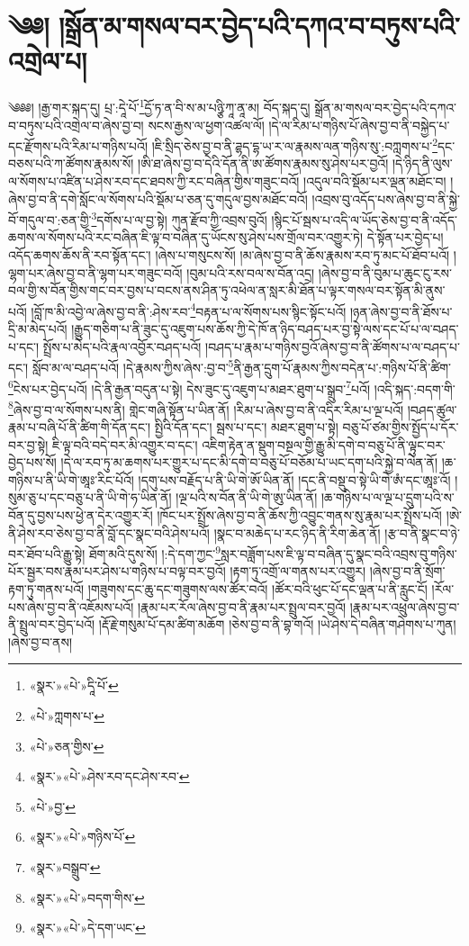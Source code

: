 \chapter{༄༅། །སྒྲོན་མ་གསལ་བར་བྱེད་པའི་དཀའ་བ་བཏུས་པའི་འགྲེལ་པ།}༄༅༅། །རྒྱ་གར་སྐད་དུ། པྲ་:དཱེ་པོ་\footnote{«སྣར་»«པེ་»དཱི་པོ་}དྱོ་ཏ་ན་བི་ས་མ་པཉྩི་ཀཱ་ནཱ་མ། བོད་སྐད་དུ། སྒྲོན་མ་གསལ་བར་བྱེད་པའི་དཀའ་བ་བཏུས་པའི་འགྲེལ་བ་ཞེས་བྱ་བ། སངས་རྒྱས་ལ་ཕྱག་འཚལ་ལོ། །དེ་ལ་རིམ་པ་གཉིས་པོ་ཞེས་བྱ་བ་ནི་བསྐྱེད་པ་དང་རྫོགས་པའི་རིམ་པ་གཉིས་པའོ། །ཇི་སྲིད་ཅེས་བྱ་བ་ནི་ཌྷད་དྷ་ཡ་ར་ལ་རྣམས་ལན་གཉིས་སུ་:བཀླགས་པ་\footnote{«པེ་»ཀླགས་པ་}དང་བཅས་པའི་ཀ་ཚོགས་རྣམས་སོ། །ཨི་ཐ་ཞེས་བྱ་བ་དེའི་དོན་ནི་ཨ་ཚོགས་རྣམས་སུ་ཤེས་པར་བྱའོ། །དེ་ཉིད་ནི་ལུས་ལ་སོགས་པ་འཛིན་པ་ཤེས་རབ་དང་ཐབས་ཀྱི་རང་བཞིན་གྱིས་གཟུང་བའོ། །འདུལ་བའི་སྡོམ་པར་ལྡན་མཐོང་བ། །ཞེས་བྱ་བ་ནི་དགེ་སློང་ལ་སོགས་པའི་སྡོམ་པ་ཅན་དུ་གདུལ་བྱས་མཐོང་བའོ། །འབྲས་བུ་འདོད་པས་ཞེས་བྱ་བ་ནི་སྐྱེ་བོ་གདུལ་བ་:ཅན་གྱི་\footnote{«པེ་»ཅན་གྱིས་}དགོས་པ་ལ་བྱ་སྟེ། ཀུན་རྫོབ་ཀྱི་འབྲས་བུའོ། །སྙིང་པོ་སྦས་པ་འདི་ལ་ཡོད་ཅེས་བྱ་བ་ནི་འདོད་ཆགས་ལ་སོགས་པའི་རང་བཞིན་ཇི་ལྟ་བ་བཞིན་དུ་ཡོངས་སུ་ཤེས་པས་གྲོལ་བར་འགྱུར་ཏེ། དེ་སྟོན་པར་བྱེད་པ། འདོད་ཆགས་ཆོས་ནི་རབ་སྟོན་དང་། །ཞེས་པ་གསུངས་སོ། །མ་ཞེས་བྱ་བ་ནི་ཆོས་རྣམས་རབ་ཏུ་མང་པོ་ཐོབ་པའོ། །ལྷག་པར་ཞེས་བྱ་བ་ནི་ལྷག་པར་གཟུང་བའོ། །བུམ་པའི་རས་བལ་ས་བོན་འདྲ། །ཞེས་བྱ་བ་ནི་བུམ་པ་ཆུང་ངུ་རས་བལ་གྱི་ས་བོན་གྱིས་གང་བར་བྱས་པ་བངས་ནས་ཤིན་ཏུ་འཕེལ་ན་སླར་མི་ཐོན་པ་ལྟར་གསལ་བར་སྟོན་མི་ནུས་པའོ། །བློ་ཁ་མི་འབྱེ་ལ་ཞེས་བྱ་བ་ནི་:ཤེས་རབ་\footnote{«སྣར་»«པེ་»ཤེས་རབ་དང་ཤེས་རབ་}བརྟན་པ་ལ་སོགས་པས་སྙིང་སྟོང་པའོ། །ཉན་ཞེས་བྱ་བ་ནི་ཐོས་པ་དྲི་མ་མེད་པའོ། །རྒྱུད་གཅིག་པ་ནི་ཟུང་དུ་འཇུག་པས་ཆོས་ཀྱི་དེ་ཁོ་ན་ཉིད་བཤད་པར་བྱ་སྟེ་ལས་དང་པོ་པ་ལ་བཤད་པ་དང་། སྤྲོས་པ་མེད་པའི་རྣལ་འབྱོར་བཤད་པའོ། །བཤད་པ་རྣམ་པ་གཉིས་བྱའོ་ཞེས་བྱ་བ་ནི་ཚོགས་པ་ལ་བཤད་པ་དང་། སློབ་མ་ལ་བཤད་པའོ། །དེ་རྣམས་ཀྱིས་ཞེས་:བྱ་བ་\footnote{«པེ་»བྱ་}ནི་རྒྱན་དྲུག་པོ་རྣམས་ཀྱིས་བདེན་པ་:གཉིས་པོ་ནི་ཚིག་\footnote{«སྣར་»«པེ་»གཉིས་པོ་}ངེས་པར་བྱེད་པའོ། །དེ་ནི་རྒྱན་བདུན་པ་སྟེ། དེས་ཟུང་དུ་འཇུག་པ་མཐར་ཐུག་པ་སྒྲུབ་\footnote{«སྣར་»བསྒྲུབ་}པའོ། །འདི་སྐད་:བདག་གི་\footnote{«སྣར་»«པེ་»བདག་གིས་}ཞེས་བྱ་བ་ལ་སོགས་པས་ནི། གླེང་གཞི་སྟོན་པ་ཡིན་ནོ། །རིམ་པ་ཞེས་བྱ་བ་ནི་འདིར་རིམ་པ་ལྔ་པའོ། །བཤད་ཚུལ་རྣམ་པ་བཞི་པོ་ནི་ཚིག་གི་དོན་དང་། སྤྱིའི་དོན་དང་། སྦས་པ་དང་། མཐར་ཐུག་པ་སྟེ། བཅུ་པོ་ཙམ་གྱིས་སྤྱོད་པ་དོར་བར་བྱ་སྟེ། ཇི་ལྟ་བའི་བདེ་བར་མི་འགྱུར་བ་དང་། འཇིག་རྟེན་ན་སྡུག་བསྔལ་གྱི་རྒྱུ་མི་དགེ་བ་བཅུ་པོ་ནི་ལྟུང་བར་བྱེད་པས་སོ། །དེ་ལ་རབ་ཏུ་མ་ཆགས་པར་གྱུར་པ་དང་མི་དགེ་བ་བཅུ་པོ་བཅོམ་པ་ཡང་དག་པའི་སྐྱེ་བ་ལེན་ནོ། །ཆ་གཉིས་པ་ནི་ཡི་གེ་ཨཱཿ་རིང་པོའོ། །དགུ་པས་བརྗོད་པ་ནི་ཡི་གེ་ཨོ་ཡིན་ནོ། །དང་ནི་བསྡུ་བ་སྟེ་ཡི་གེ་ཨཾ་དང་ཨཱཿ་འོ། །སུམ་ཅུ་པ་དང་བཅུ་པ་ནི་ཡི་གེ་ཧ་ཡིན་ནོ། །ལྔ་པའི་ས་བོན་ནི་ཡི་གེ་ཨུ་ཡིན་ནོ། །ཆ་གཉིས་པ་ལ་ལྔ་པ་དྲུག་པའི་ས་བོན་དུ་བྱས་པས་ཕྱེ་ན་དེར་འགྱུར་རོ། །ཁོང་པར་སྤྲོས་ཞེས་བྱ་བ་ནི་ཆོས་ཀྱི་འབྱུང་གནས་སུ་རྣམ་པར་སྤྲོས་པའོ། །ཨེ་ནི་ཤེས་རབ་ཅེས་བྱ་བ་ནི་བློ་དང་སྣང་བའི་ཤེས་པའོ། །སྣང་བ་མཆེད་པ་རང་ཉིད་ནི་རིག་ཆེན་ནོ། །རྩ་བ་ནི་སྣང་བ་ཉེ་བར་ཐོབ་པའི་རྒྱུ་སྟེ། ཐོག་མའི་དུས་སོ། །:དེ་དག་ཀྱང་\footnote{«སྣར་»«པེ་»དེ་དག་ཡང་}སླར་བཟློག་པས་ཇི་ལྟ་བ་བཞིན་དུ་སྣང་བའི་འབྲས་བུ་གཉིས་པོར་སྦྱར་བས་རྣམ་པར་ཤེས་པ་གཉིས་པ་བལྟ་བར་བྱའོ། །རྟག་ཏུ་འགྲོ་ལ་གནས་པར་འགྱུར། །ཞེས་བྱ་བ་ནི་སྲོག་རྟག་ཏུ་གནས་པའོ། །གཟུགས་དང་ཆུ་དང་གཟུགས་ལས་ཚོར་བའོ། །ཚོར་བའི་ཕུང་པོ་དང་ལྡན་པ་ནི་རླུང་ངོ། །རོལ་པས་ཞེས་བྱ་བ་ནི་འཇོམས་པའོ། །རྣམ་པར་རོལ་ཞེས་བྱ་བ་ནི་རྣམ་པར་སྤྲུལ་བར་བྱའོ། །རྣམ་པར་འཕྲུལ་ཞེས་བྱ་བ་ནི་སྤྲུལ་བར་བྱེད་པའོ། །རྡོ་རྗེ་གསུམ་པོ་དམ་ཚིག་མཆོག །ཅེས་བྱ་བ་ནི་བྷ་གའོ། །ཡེ་ཤེས་དེ་བཞིན་གཤེགས་པ་ཀུན། །ཞེས་བྱ་བ་ནས། 